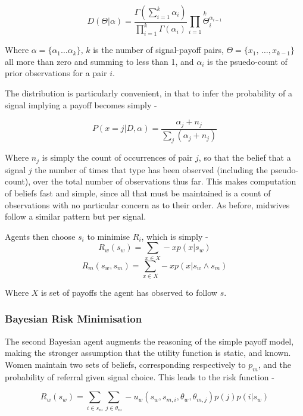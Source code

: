 \[
D(\Theta|\alpha)=\frac{\Gamma(\sum_{i=1}^{k}\alpha_{i})}{\prod_{i=1}^{k}\Gamma(\alpha_{i})}\overset{k}{\underset{i=1}{\prod}\Theta_{i}^{\alpha_{i-1}}}
\]


Where \(\alpha=\{\alpha_{1}\ldots\alpha_{k}\}\), \(k\) is the number
of signal-payoff pairs, \(\Theta=\{x_{1},\,\ldots,x_{k-\text{1}}\}\) all
more than zero and summing to less than 1, and \(\alpha_{i}\) is the 
psuedo-count of prior observations for a pair \(i\). 

The distribution is particularly convenient, in that to infer the
probability of a signal implying a payoff becomes
simply -

\begin{equation}
P(x=j|D,\alpha)=\frac{\alpha_{j}+n_{j}}{\sum_{j}(\alpha_{j}+n_{j})}\label{eq:posterior}
\end{equation}


Where \(n_{j}\) is simply the count of occurrences of pair \(j\), so
that the belief that a signal \(j\) the number
of times that type has been observed (including the pseudo-count),
over the total number of observations thus far. This makes computation
of beliefs fast and simple, since all that must be maintained is
a count of observations with no particular concern as to their order.
As before, midwives follow a similar pattern but per signal.

Agents then choose $s_{i}$ to minimise $R_{i}$, which is simply - 
\begin{equation}
R_{w}(s_{w}) = \sum_{x \in X} -xp(x | s_{w})
\end{equation}
\begin{equation}
R_{m}(s_{w}, s_{m}) = \sum_{x \in X} -xp(x | s_{w}\wedge s_{m})
\end{equation}

Where $X$ is set of payoffs the agent has observed to follow $s$.

\subsubsection{Bayesian Risk Minimisation}

The second Bayesian agent augments the reasoning of the simple payoff model, making the stronger assumption that the utility function is static, and known. Women maintain two sets of beliefs, corresponding respectively to \(p_{m}\), and the probability of referral given signal choice. This leads to the risk function -

\begin{equation}
R_{w}(s_{w}) = \sum_{i\in s_{m}}\sum_{j\in \theta_{m}} -u_{w}(s_{w}, s_{m, i}, \theta_{w}, \theta_{m, j})p(j)p(i | s_{w})
\end{equation}

